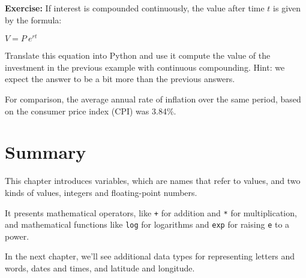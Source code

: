 \textbf{Exercise:} If interest is compounded continuously, the value
after time \(t\) is given by the formula:

\(V=P~e^{rt}\)

Translate this equation into Python and use it compute the value of the
investment in the previous example with continuous compounding. Hint: we
expect the answer to be a bit more than the previous answers.

For comparison, the average annual rate of inflation over the same
period, based on the consumer price index (CPI) was 3.84\%.

\hypertarget{summary}{%
\section{Summary}\label{summary}}

This chapter introduces variables, which are names that refer to values,
and two kinds of values, integers and floating-point numbers.

It presents mathematical operators, like \passthrough{\lstinline!+!} for
addition and \passthrough{\lstinline!*!} for multiplication, and
mathematical functions like \passthrough{\lstinline!log!} for logarithms
and \passthrough{\lstinline!exp!} for raising
\passthrough{\lstinline!e!} to a power.

In the next chapter, we'll see additional data types for representing
letters and words, dates and times, and latitude and longitude.

